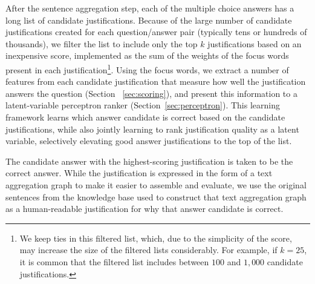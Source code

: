 After the sentence aggregation step, each of the multiple choice answers has a long list of candidate justifications.  Because of the large number of candidate justifications created for each question/answer pair (typically tens or hundreds of thousands), we filter the list to include only the top $k$ justifications based on an inexpensive score, implemented as the sum of the weights of the focus words present in each justification\footnote{We keep ties in this filtered list, which, due to the simplicity of the score, may increase the size of the filtered lists considerably. For example, if $k=25$, it is common that the filtered list includes between $100$ and $1,000$ candidate justifications.}. 
Using the focus words, we extract a number of features from each candidate justification that measure how well the justification answers the question (Section ~\ref{sec:scoring}), and present this information to a latent-variable perceptron ranker (Section~\ref{sec:perceptron}).  This learning framework learns which answer candidate is correct based on the candidate justifications, while also jointly learning to rank justification quality as a latent variable, selectively elevating good answer justifications to the top of the list.  

The candidate answer with the highest-scoring justification is taken to be the correct answer.  While the justification is expressed in the form of a text aggregation graph to make it easier to assemble and evaluate, we use the original sentences from the knowledge base used to construct that text aggregation graph as a human-readable justification for why that answer candidate is correct. 

